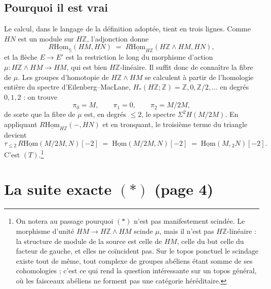 \documentclass[11pt,a4paper]{article}
\begin{document}
\subsection*{Pourquoi il est vrai}

Le calcul, dans le langage de la définition adoptée, tient en trois lignes.
Comme $HN$ est un module sur $H\mathbb{Z}$, l'adjonction donne
\[ R\underline{\mathrm{Hom}}_{\mathbb{S}}(HM, HN) \;=\;
   R\underline{\mathrm{Hom}}_{H\mathbb{Z}}(H\mathbb{Z} \wedge HM, HN), \]
et la flèche $E \to E'$ est la restriction le long du morphisme d'action
$\mu : H\mathbb{Z} \wedge HM \to HM$, qui est bien $H\mathbb{Z}$-linéaire. Il
suffit donc de connaître la fibre de $\mu$. Les groupes d'homotopie de
$H\mathbb{Z} \wedge HM$ se calculent à partir de l'homologie entière du
spectre d'Eilenberg--MacLane, $H_*(H\mathbb{Z};\mathbb{Z}) = \mathbb{Z}, 0,
\mathbb{Z}/2, \ldots$ en degrés $0, 1, 2$ : on trouve
\[ \pi_0 = M, \qquad \pi_1 = 0, \qquad \pi_2 = M/2M , \]
de sorte que la fibre de $\mu$ est, en degrés $\leq 2$, le spectre
$\Sigma^2 H(M/2M)$. En appliquant
$R\underline{\mathrm{Hom}}_{H\mathbb{Z}}(-, HN)$ et en tronquant, le troisième
terme du triangle devient
\[ \tau_{\leq 2} \, R\underline{\mathrm{Hom}}(M/2M, N)[-2] \;=\;
   \underline{\mathrm{Hom}}(M/2M, N)[-2] \;=\;
   \underline{\mathrm{Hom}}(M, {}_2 N)[-2] . \]
C'est $(T)$.\footnote{On notera au passage pourquoi $(*)$ n'est pas
manifestement scindée. Le morphisme d'unité $HM \to H\mathbb{Z} \wedge HM$
scinde $\mu$, mais il n'est pas $H\mathbb{Z}$-linéaire : la structure de
module de la source est celle de $HM$, celle du but celle du facteur de
gauche, et elles ne coïncident pas. Sur le topos ponctuel le scindage existe
tout de même, tout complexe de groupes abéliens étant somme de ses
cohomologies ; c'est ce qui rend la question intéressante sur un topos
général, où les faisceaux abéliens ne forment pas une catégorie héréditaire.}

\section*{La suite exacte $(*)$ (page 4)}
\end{document}
